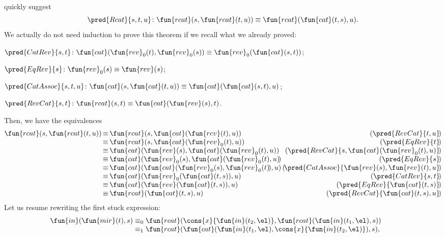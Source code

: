 quickly suggest
\begin{equation*}
  \pred{Rcat}{s,t,u} \colon \fun{rcat}(s,\fun{rcat}(t,u)) \equiv \fun{rcat}(\fun{cat}(t,s),u).
\end{equation*}
We actually do not need induction to prove this theorem if we recall
what we already proved:
\begin{itemize*}

  \item \(\pred{CatRev}{s,t} \colon \fun{cat}(\fun{rev}_0(t),
    \fun{rev}_0(s)) \equiv \fun{rev}_0(\fun{cat}(s,t))\);

  \item \(\pred{EqRev}{s} \colon \fun{rev}_0(s) \equiv \fun{rev}(s)\);

  \item \(\pred{CatAssoc}{s,t,u} \colon \fun{cat}(s,\fun{cat}(t,u))
    \equiv \fun{cat}(\fun{cat}(s,t),u)\);

  \item \(\pred{RevCat}{s,t} \colon \fun{rcat}(s,t) \equiv
    \fun{cat}(\fun{rev}(s),t)\).

\end{itemize*}
Then, we have the equivalences
\begin{equation*}
\begin{array}{@{}r@{\,}c@{\,}l@{\,}r@{}}
\fun{rcat}(s,\fun{rcat}(t,u))
& \equiv & \fun{rcat}(s,\fun{cat}(\fun{rev}(t),u))
& (\pred{RevCat}{t,u}\!)\\
& \equiv & \fun{rcat}(s,\fun{cat}(\fun{rev}_0(t),u))
& (\pred{EqRev}{t}\!)\\
& \equiv & \fun{cat}(\fun{rev}(s),\fun{cat}(\fun{rev}_0(t),u))
& (\pred{RevCat}{s,\fun{cat}(\fun{rev}_0(t),u)}\!)\\
& \equiv & \fun{cat}(\fun{rev}_0(s),\fun{cat}(\fun{rev}_0(t),u)\!)
& (\pred{EqRev}{s}\!)\\
& \equiv & \fun{cat}(\fun{cat}(\fun{rev}_0(s),\fun{rev}_0(t)\!),u)\!\!
& (\!\pred{CatAssoc}{\fun{rev}(s),\fun{rev}(t),u}\!)\\
& \equiv & \fun{cat}(\fun{rev}_0(\fun{cat}(t,s)),u)
& (\pred{CatRev}{s,t}\!)\\
& \equiv & \fun{cat}(\fun{rev}(\fun{cat}(t,s)),u)
& (\pred{EqRev}{\fun{cat}(t,s)}\!)\\
& \equiv & \fun{rcat}(\fun{cat}(t,s),u)
& (\pred{RevCat}{\fun{cat}(t,s),u}\!)
\end{array}
\end{equation*}
Let us resume rewriting the first stuck expression:
\begin{equation*}
\begin{array}{@{}r@{\;}c@{\;}l@{\qquad}r@{}}
\fun{in}(\fun{mir}(t),s)
& \equiv_0
& \fun{rcat}(\cons{x}{\fun{in}(t_2,\el)},
  \fun{rcat}(\fun{in}(t_1,\el),s))\\
& \equiv_1
& \fun{rcat}(\fun{cat}(\fun{in}(t_1,\el),
  \cons{x}{\fun{in}(t_2,\el)}), s),\index{rcat@\fun{rcat/2}|)}
\end{array}
\end{equation*}
